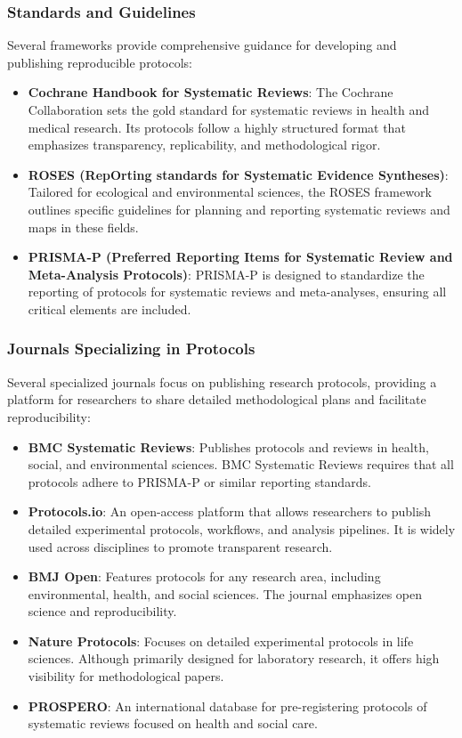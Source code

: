 \documentclass[
]{book}
\begin{document}
\subsubsection{Standards and Guidelines}\label{standards-and-guidelines}

Several frameworks provide comprehensive guidance for developing and publishing reproducible protocols:

\begin{itemize}
\item
  \textbf{Cochrane Handbook for Systematic Reviews}: The Cochrane Collaboration sets the gold standard for systematic reviews in health and medical research.
  Its protocols follow a highly structured format that emphasizes transparency, replicability, and methodological rigor.
\item
  \textbf{ROSES (RepOrting standards for Systematic Evidence Syntheses)}: Tailored for ecological and environmental sciences, the ROSES framework outlines specific guidelines for planning and reporting systematic reviews and maps in these fields.
\item
  \textbf{PRISMA-P (Preferred Reporting Items for Systematic Review and Meta-Analysis Protocols)}: PRISMA-P is designed to standardize the reporting of protocols for systematic reviews and meta-analyses, ensuring all critical elements are included.
\end{itemize}

\subsubsection{Journals Specializing in Protocols}\label{journals-specializing-in-protocols}

Several specialized journals focus on publishing research protocols, providing a platform for researchers to share detailed methodological plans and facilitate reproducibility:

\begin{itemize}
\item
  \textbf{BMC Systematic Reviews}: Publishes protocols and reviews in health, social, and environmental sciences.
  BMC Systematic Reviews requires that all protocols adhere to PRISMA-P or similar reporting standards.
\item
  \textbf{Protocols.io}: An open-access platform that allows researchers to publish detailed experimental protocols, workflows, and analysis pipelines.
  It is widely used across disciplines to promote transparent research.
\item
  \textbf{BMJ Open}: Features protocols for any research area, including environmental, health, and social sciences.
  The journal emphasizes open science and reproducibility.
\item
  \textbf{Nature Protocols}: Focuses on detailed experimental protocols in life sciences.
  Although primarily designed for laboratory research, it offers high visibility for methodological papers.
\item
  \textbf{PROSPERO}: An international database for pre-registering protocols of systematic reviews focused on health and social care.
\end{itemize}
\end{document}
